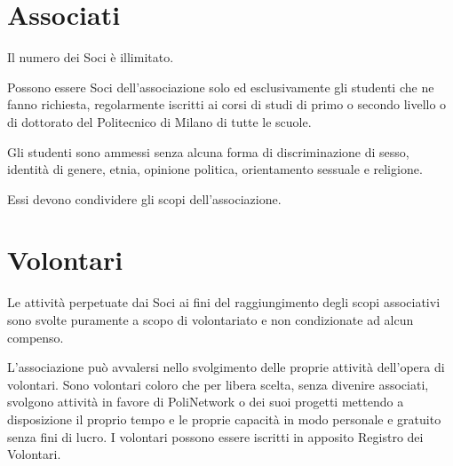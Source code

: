 \documentclass[legalpaper, 11pt]{exam}
\let\tempone\enumerate
\let\temptwo\endenumerate
\renewenvironment{enumerate}{\tempone\addtolength{\itemsep}{-0.45\baselineskip}}{\temptwo}
\begin{document}
{\section{Associati}
\begin{enumerate}
 \item Il numero dei Soci è illimitato. 
 \item Possono essere Soci dell’associazione solo ed esclusivamente gli studenti che ne fanno richiesta, regolarmente iscritti ai corsi di studi di primo o secondo livello o di dottorato del Politecnico di Milano di tutte le scuole.
 \item Gli studenti sono ammessi senza alcuna forma di discriminazione di sesso, identità di genere, etnia, opinione politica, orientamento sessuale e religione.
 \item Essi devono condividere gli scopi dell’associazione.
\end{enumerate}

\section{Volontari}
\begin{enumerate}
 \item Le attività perpetuate dai Soci ai fini del raggiungimento degli scopi associativi sono svolte puramente a scopo di volontariato e non condizionate ad alcun compenso.
 \item L'associazione può avvalersi nello svolgimento delle proprie attività dell'opera di volontari. Sono volontari coloro che per libera scelta, senza divenire associati, svolgono attività in favore di PoliNetwork o dei suoi progetti mettendo a disposizione il proprio tempo e le proprie capacità in modo personale e gratuito senza fini di lucro. I volontari possono essere iscritti in apposito Registro dei Volontari.
\end{enumerate}

}
\end{document}
